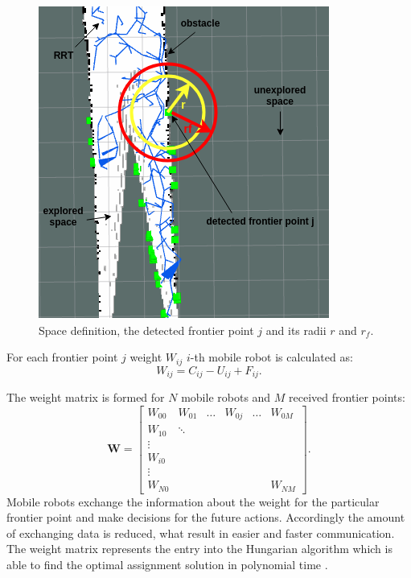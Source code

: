 \documentclass[letterpaper, 10 pt, conference]{ieeeconf}  %
\begin{document}
\begin{figure}[h!]
	\centering\includegraphics[width=0.8\columnwidth]{radius-and-space.png}
	\caption{Space definition, the detected frontier point $j$ and its radii $r$ and $r_{f}$.}
	\label{fig:radijusi}
\end{figure}

For each frontier point $j$ weight $W_{ij}$ $i$-th mobile robot is calculated as: 
\begin{equation}
   {W}_{ij}= {C_{ij}} - {U_{ij}} + {F_{ij}}.
   \label{weight}
\end{equation}

The weight matrix   is formed for $N$ mobile robots and $M$ received frontier points: 
\begin{equation}
    \boldsymbol{W} = \begin{bmatrix}
    W_{00} & W_{01} & \hdots & W_{0j} & \hdots & W_{0M}\\
    W_{10} & \ddots \\
    \vdots  \\
    W_{i0} \\
    \vdots \\
    W_{N0} &        &     &     &        &    W_{NM}
    \end{bmatrix}.
\end{equation}
Mobile robots exchange the information about the weight for the particular frontier point and make decisions for the future actions. Accordingly the amount of exchanging data is reduced, what result in easier and faster communication.
The weight matrix  represents the entry into the Hungarian algorithm which is able to find the optimal assignment solution in polynomial time \cite{hungarian}. 
\end{document}
